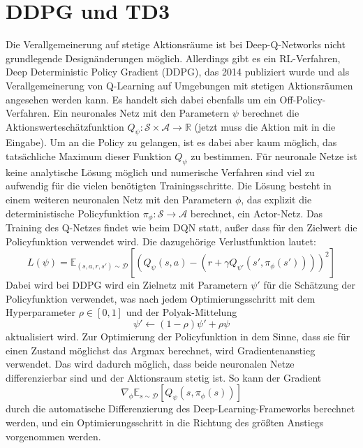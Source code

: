 \section{DDPG und TD3}
Die Verallgemeinerung auf stetige Aktionsräume ist bei Deep-Q-Networks nicht grundlegende Designänderungen möglich.
Allerdings gibt es ein RL-Verfahren, Deep Deterministic Policy Gradient (DDPG), das 2014 publiziert wurde und als Verallgemeinerung von Q-Learning auf Umgebungen mit stetigen Aktionsräumen angesehen werden kann. \cite{10.5555/3044805.3044850}
Es handelt sich dabei ebenfalls um ein Off-Policy-Verfahren.
Ein neuronales Netz mit den Parametern $\psi$ berechnet die Aktionswerteschätzfunktion $Q_\psi: \mathcal{S} \times \mathcal{A}\rightarrow \mathbb{R}$ (jetzt muss die Aktion mit in die Eingabe).
Um an die Policy zu gelangen, ist es dabei aber kaum möglich, das tatsächliche Maximum dieser Funktion $Q_\psi$ zu bestimmen.
Für neuronale Netze ist keine analytische Lösung möglich und numerische Verfahren sind viel zu aufwendig für die vielen benötigten Trainingsschritte.
Die Lösung besteht in einem weiteren neuronalen Netz mit den Parametern $\phi$, das explizit die deterministische Policyfunktion $\pi_\phi: \mathcal{S} \rightarrow \mathcal{A}$ berechnet, ein Actor-Netz.
Das Training des Q-Netzes findet wie beim DQN statt, außer dass für den Zielwert die Policyfunktion verwendet wird.
Die dazugehörige Verlustfunktion lautet:
\begin{equation}
	L(\psi) = \mathbb{E}_{(s, a, r, s')\sim\mathcal{D}}\left[\left(Q_\psi(s,a)-\left(r+\gamma Q_{\psi'}(s',\pi_\phi(s'))\right)\right)^2\right]
\end{equation}
Dabei wird bei DDPG wird ein Zielnetz mit Parametern $\psi'$ für die Schätzung der Policyfunktion verwendet, was nach jedem Optimierungsschritt mit dem Hyperparameter $\rho \in [0, 1]$ und der Polyak-Mittelung
\begin{equation}
	\psi' \leftarrow (1 - \rho) \psi' + \rho \psi
\end{equation}
aktualisiert wird.
Zur Optimierung der Policyfunktion in dem Sinne, dass sie für einen Zustand möglichst das Argmax berechnet, wird Gradientenanstieg verwendet.
Das wird dadurch möglich, dass beide neuronalen Netze differenzierbar sind und der Aktionsraum stetig ist.
So kann der Gradient
\begin{equation}
	\nabla_\phi \mathbb{E}_{s\sim\mathcal{D}}\left[Q_\psi(s, \pi_\phi(s))\right]
\end{equation}
durch die automatische Differenzierung des Deep-Learning-Frameworks berechnet werden, und ein Optimierungsschritt in die Richtung des größten Anstiegs vorgenommen werden.

